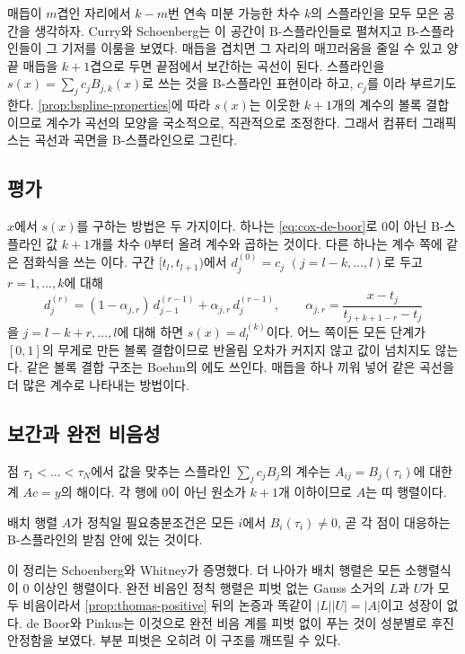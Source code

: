 매듭이 $m$겹인 자리에서 $k-m$번 연속 미분 가능한 차수 $k$의 스플라인을 모두 모은 공간을 생각하자. Curry와 Schoenberg는 이 공간이 B-스플라인들로 펼쳐지고 B-스플라인들이 그 기저를 이룸을 보였다\cite{curry1966}. 매듭을 겹치면 그 자리의 매끄러움을 줄일 수 있고 양 끝 매듭을 $k+1$겹으로 두면 끝점에서 보간하는 곡선이 된다. 스플라인을 $s(x)=\sum_jc_jB_{j,k}(x)$로 쓰는 것을 B-스플라인 표현이라 하고, $c_j$를 이라 부르기도 한다. \cref{prop:bspline-properties}에 따라 $s(x)$는 이웃한 $k+1$개의 계수의 볼록 결합이므로 계수가 곡선의 모양을 국소적으로, 직관적으로 조정한다. 그래서 컴퓨터 그래픽스는 곡선과 곡면을 B-스플라인으로 그린다.

\subsection{평가}

$x$에서 $s(x)$를 구하는 방법은 두 가지이다. 하나는 \eqref{eq:cox-de-boor}로 $0$이 아닌 B-스플라인 값 $k+1$개를 차수 $0$부터 올려 계수와 곱하는 것이다. 다른 하나는 계수 쪽에 같은 점화식을 쓰는 이다. 구간 $[t_l,t_{l+1})$에서 $d_j^{(0)}=c_j$ $(j=l-k,\dots,l)$로 두고 $r=1,\dots,k$에 대해
\[
d_j^{(r)}=(1-\alpha_{j,r})\,d_{j-1}^{(r-1)}+\alpha_{j,r}\,d_j^{(r-1)},\qquad\alpha_{j,r}=\frac{x-t_j}{t_{j+k+1-r}-t_j}
\]
을 $j=l-k+r,\dots,l$에 대해 하면 $s(x)=d_l^{(k)}$이다. 어느 쪽이든 모든 단계가 $[0,1]$의 무게로 만든 볼록 결합이므로 반올림 오차가 커지지 않고 값이 넘치지도 않는다. 같은 볼록 결합 구조는 Boehm의 에도 쓰인다\cite{boehm1980}. 매듭을 하나 끼워 넣어 같은 곡선을 더 많은 계수로 나타내는 방법이다.

\subsection{보간과 완전 비음성}

점 $\tau_1<\dots<\tau_N$에서 값을 맞추는 스플라인 $\sum_jc_jB_j$의 계수는  $A_{ij}=B_j(\tau_i)$에 대한 계 $Ac=y$의 해이다. 각 행에 $0$이 아닌 원소가 $k+1$개 이하이므로 $A$는 띠 행렬이다.

\begin{theorem}
\label{thm:schoenberg-whitney}
배치 행렬 $A$가 정칙일 필요충분조건은 모든 $i$에서 $B_i(\tau_i)\ne0$, 곧 각 점이 대응하는 B-스플라인의 받침 안에 있는 것이다.
\end{theorem}

이 정리는 Schoenberg와 Whitney가 증명했다\cite{schoenberg1953whitney}. 더 나아가 배치 행렬은 모든 소행렬식이 $0$ 이상인  행렬이다\cite{karlin1968,deboor2001guide}. 완전 비음인 정칙 행렬은 피벗 없는 Gauss 소거의 $L$과 $U$가 모두 비음이라서 \cref{prop:thomas-positive} 뒤의 논증과 똑같이 $|L||U|=|A|$이고 성장이 없다. de Boor와 Pinkus는 이것으로 완전 비음 계를 피벗 없이 푸는 것이 성분별로 후진 안정함을 보였다\cite{deboor1977pinkus}. 부분 피벗은 오히려 이 구조를 깨뜨릴 수 있다.

